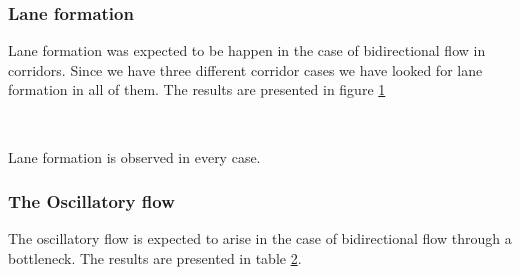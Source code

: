 \subsubsection{Lane formation}
Lane formation was expected to be happen in the case of bidirectional 
flow in corridors. Since we have three different corridor cases we have 
looked for lane formation in all of them. The results are presented in 
figure \ref{fig:laneformation}

\begin{figure}[h]
\centering
{}
\\
\caption{}
\label{fig:laneformation}
\end{figure}

Lane formation is observed in every case.

\subsubsection{The Oscillatory flow}
The oscillatory flow is expected to arise in the case of bidirectional 
flow through a bottleneck. The results are presented in table
\ref{fig:oscillitoryflow}.

\begin{figure}[h]
\centering
{}
\caption{}
\label{fig:oscillitoryflow}
\end{figure}

